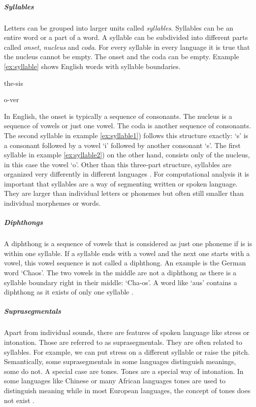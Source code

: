 \subparagraph{Syllables} Letters can be grouped into larger units called \textit{syllables}. Syllables can be an entire word or a part of a word. A syllable can be subdivided into different parts called \textit{onset}, \textit{nucleus} and \textit{coda}. For every syllable in every language it is true that the nucleus cannot be empty. The onset and the coda can be empty. Example \ref{ex:syllable} shows English words with syllable boundaries.
\begin{covsubexamples}[preamble={English syllables: the hyphen denotes a syllable boundary.}]
\label{ex:syllable}
\item \label{ex:syllable1} the-sis
\item \label{ex:syllable2} o-ver
\end{covsubexamples}
In English, the onset is typically a sequence of consonants. The nucleus is a sequence of vowels or just one vowel. The coda is another sequence of consonants. The second syllable in example \ref{ex:syllable1}) follows this structure exactly: `s' is a consonant followed by a vowel `i' followed by another consonant `s'. The first syllable in example \ref{ex:syllable2}) on the other hand, consists only of the nucleus, in this case the vowel `o'. Other than this three-part structure, syllables are organized very differently in different languages \citep{Intro.2007}. For computational analysis it is important that syllables are a way of segmenting written or spoken language. They are larger than individual letters or phonemes but often still smaller than individual morphemes or words. 

\subparagraph{Diphthongs}
A diphthong is a sequence of vowels that is considered as just one phoneme if is is within one syllable. If a syllable ends with a vowel and the next one starts with a vowel, this vowel sequence is not called a diphthong. An example is the German word `Chaos'. The two vowels in the middle are not a diphthong as there is a syllable boundary right in their middle: `Cha-os'. A word like `aus' contains a diphthong as it exists of only one syllable \citep{Intro.2007}. 

\subparagraph{Suprasegmentals} Apart from individual sounds, there are features of spoken language like stress or intonation. Those are referred to as suprasegmentals. They are often related to syllables. For example, we can put stress on a different syllable or raise the pitch. Semantically, some suprasegmentals in some languages distinguish meanings, some do not. A special case are tones. Tones are a special way of intonation. In some languages like Chinese or many African languages tones are used to distinguish meaning while in most European languages, the concept of tones does not exist \citep{Intro.2007}.


